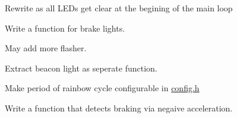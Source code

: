 
\begin{DoxyRefList}
\item[\label{todo__todo000002}%
\hypertarget{todo__todo000002}{}%
Global \hyperlink{group__car_ga6b1fd674445dd1c654dfe8b8b65f168e}{beam} (unsigned long state)]Rewrite as all L\+E\+Ds get clear at the begining of the main loop  
\item[\label{todo__todo000001}%
\hypertarget{todo__todo000001}{}%
File \hyperlink{car__basics_8ino}{car\+\_\+basics.ino} ]Write a function for brake lights.  
\item[\label{todo__todo000003}%
\hypertarget{todo__todo000003}{}%
File \hyperlink{police_8ino}{police.ino} ]May add more flasher. 

Extract beacon light as seperate function.  
\item[\label{todo__todo000004}%
\hypertarget{todo__todo000004}{}%
File \hyperlink{rainbow_8ino}{rainbow.ino} ]Make period of rainbow cycle configurable in \hyperlink{config_8h}{config.\+h}  
\item[\label{todo__todo000005}%
\hypertarget{todo__todo000005}{}%
File \hyperlink{speed_8ino}{speed.ino} ]Write a function that detects braking via negaive acceleration. 
\end{DoxyRefList}